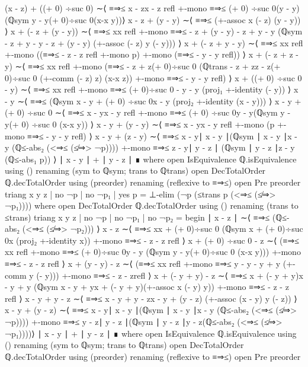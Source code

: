 \documentclass[11pt,a4paper]{article}
\begin{document}
\begin{code}
  (x - z) + ((+ 0) ÷suc 0) ∼⟨  ≡⇒≤ {x - z}{x - z} refl
  +-mono ≡⇒≤ {(+ 0) ÷suc 0}{(y - y)}(ℚsym {y - y}{(+ 0)÷suc 0}(x-x {y}))⟩
  x - z + (y - y) ∼⟨ ≡⇒≤ (+-assoc x (- z) (y - y)) ⟩
  x + (- z + (y - y)) ∼⟨ ≡⇒≤ {x}{x} refl +-mono
  ≡⇒≤ { - z + (y - y)}{ - z + y - y}
  (ℚsym { - z + y - y}{ - z + (y - y)} (+-assoc (- z) y (- y))) ⟩
  x + (- z + y - y) ∼⟨ ≡⇒≤ {x}{x} refl +-mono ((≡⇒≤ { - z}{ - z} refl
  +-mono p)  +-mono (≡⇒≤ { - y}{ - y} refl)) ⟩
  x + (- z + z - y) ∼⟨ ≡⇒≤ {x}{x} refl +-mono
  (≡⇒≤ { - z + z}{(+ 0)÷suc 0} (ℚtrans { - z + z}{z - z}{(+ 0)÷suc 0}
  (+-comm (- z) z) (x-x {z})) +-mono ≡⇒≤ { - y}{ - y} refl) ⟩
  x + ((+ 0) ÷suc 0 - y) ∼⟨ ≡⇒≤ {x}{x} refl +-mono
  ≡⇒≤ {(+ 0)÷suc 0 - y}{ - y} (proj₁ +-identity (- y)) ⟩
  x - y ∼⟨ ≡⇒≤ (ℚsym {x - y + (+ 0) ÷suc 0}{x - y} (proj₂ +-identity (x - y))) ⟩
  x - y + (+ 0) ÷suc 0 ∼⟨ ≡⇒≤ {x - y}{x - y} refl +-mono
  ≡⇒≤ {(+ 0) ÷suc 0}{y - y}(ℚsym {y - y}{(+ 0) ÷suc 0} (x-x {y})) ⟩
  x - y + (y - y) ∼⟨ ≡⇒≤ {x - y}{x - y} refl +-mono
  (p +-mono ≡⇒≤ { - y}{ - y} refl) ⟩
  x - y + (z - y) ∼⟨ ≡⇒≤ {x - y}{∣ x - y ∣}(ℚsym {∣ x - y ∣}{x - y}
  (ℚ≤-abs₂ (<⇒≤ (≰⇒> ¬p)))) +-mono ≡⇒≤ {z - y}{∣ y - z ∣}
  (ℚsym {∣ y - z ∣}{z - y} (ℚ≤-abs₁ p)) ⟩
  ∣ x - y ∣ + ∣ y - z ∣ ∎
     where
     open IsEquivalence ℚ.isEquivalence using ()
       renaming (sym to ℚsym; trans to ℚtrans)
     open DecTotalOrder ℚ.decTotalOrder using (preorder)
       renaming (reflexive to ≡⇒≤)
     open Pre preorder
triang x y z | no ¬p | no ¬p₁ | yes p =
  ⊥-elim (¬p (≤trans p (<⇒≤ (≰⇒> ¬p₁))))
  where
  open DecTotalOrder ℚ.decTotalOrder using ()
      renaming (trans to ≤trans)
triang x y z | no ¬p | no ¬p₁ | no ¬p₂ = begin 
  ∣ x - z ∣             ∼⟨ ≡⇒≤ (ℚ≤-abs₂ (<⇒≤ (≰⇒> ¬p₂)))   ⟩
  x - z                ∼⟨ ≡⇒≤ {x}{x + (+ 0)÷suc 0}
  (ℚsym {x + (+ 0)÷suc 0}{x} (proj₂ +-identity x)) +-mono ≡⇒≤ { - z}{ - z} refl ⟩
  x + (+ 0) ÷suc 0 - z ∼⟨ (≡⇒≤ {x}{x} refl  +-mono
  ≡⇒≤ {(+ 0)÷suc 0}{y - y} (ℚsym {y - y}{(+ 0)÷suc 0} (x-x {y}))) +-mono
  ≡⇒≤ { - z}{ - z} refl ⟩
  x + (y - y) - z      ∼⟨ (≡⇒≤ {x}{x} refl  +-mono
  ≡⇒≤ {y - y}{ - y + y} (+-comm y (- y))) +-mono ≡⇒≤ { - z}{ - z}refl ⟩
  x + (- y + y) - z    ∼⟨ ≡⇒≤ {x + (- y + y)}{x - y + y}
  (ℚsym {x - y + y}{x + (- y + y)}(+-assoc x (- y) y)) +-mono
    ≡⇒≤ { - z}{ - z} refl ⟩
  x - y + y - z        ∼⟨ ≡⇒≤ { x - y + y - z}{x - y + (y - z)}
    (+-assoc (x - y) y (- z)) ⟩
  x - y + (y - z)      ∼⟨ ≡⇒≤ {x - y}{∣ x - y ∣}(ℚsym {∣ x - y ∣}{x - y}
    (ℚ≤-abs₂ (<⇒≤ (≰⇒> ¬p)))) +-mono
    ≡⇒≤ {y - z}{∣ y - z ∣}(ℚsym {∣ y - z ∣}{y - z}(ℚ≤-abs₂ (<⇒≤ (≰⇒> ¬p₁))))⟩  
  ∣ x - y ∣ + ∣ y - z ∣ ∎
     where
     open IsEquivalence ℚ.isEquivalence using ()
       renaming (sym to ℚsym; trans to ℚtrans)
     open DecTotalOrder ℚ.decTotalOrder using (preorder)
       renaming (reflexive to ≡⇒≤)
     open Pre preorder
\end{code}
\end{document}
